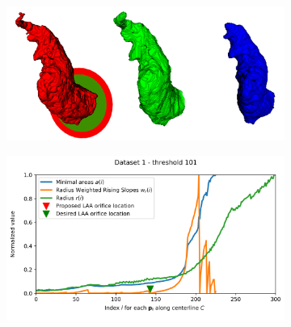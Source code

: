 \documentclass[review]{elsarticle}
\begin{document}
\begin{figure}[]
  \centering
  \begin{subfigure}[]{.5\linewidth}
    \centering
    \includegraphics[width=\textwidth]{fig14topleft.png}
  \end{subfigure}%
  \begin{subfigure}[]{.5\linewidth}
    \centering
    \includegraphics[width=\textwidth]{fig14topright.png}
  \end{subfigure}%


\end{figure}
\end{document}
